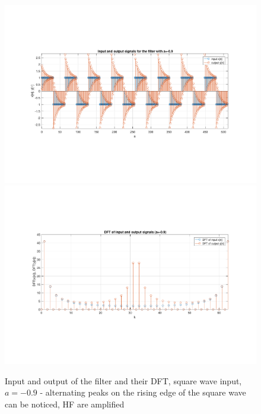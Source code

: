 \begin{figure} [H]
	\centering
	\includegraphics[trim={2.5cm 5cm 2.5cm 5cm}, clip, width=0.75\linewidth]{io_sw_1}
	\includegraphics[trim={2.5cm 5cm 2.5cm 5cm}, clip, width=0.75\linewidth]{dft_sw_1}
	\caption{Input and output of the filter and their DFT, square wave input, $a=-0.9$ - alternating peaks on the rising edge of the square wave can be noticed, HF are amplified}
	\label{fig:t1_io_sw_1}
\end{figure}
